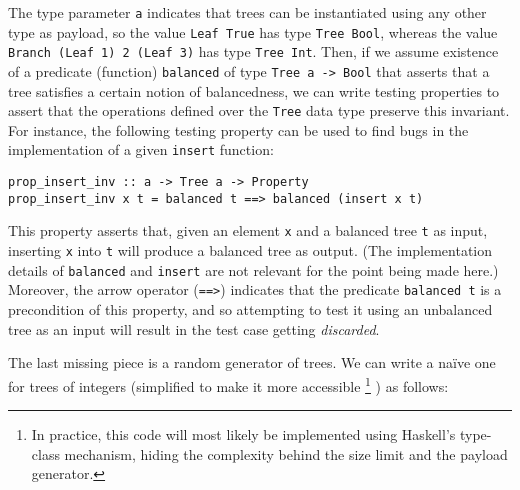 \documentclass[sigconf, anonymous, review]{acmart}
\newcommand{\quickcheck}{\textit{QuickCheck}\xspace}
\begin{document}
\noindent The type parameter \texttt{a} indicates that trees can be instantiated
using any other type as payload, so the value \texttt{Leaf True} has type
\texttt{Tree Bool}, whereas the value \texttt{Branch (Leaf 1) 2 (Leaf 3)} has
type \texttt{Tree Int}.
%
%
%
%
Then, if we assume existence of a predicate (function) \texttt{balanced} of type
\texttt{Tree a -> Bool} that asserts that a tree satisfies a certain notion of
balancedness, we can write testing properties to assert that the operations
defined over the \texttt{Tree} data type preserve this invariant.
%
For instance, the following testing property can be used to find bugs in the
implementation of a given \texttt{insert} function:

\begin{verbatim}
prop_insert_inv :: a -> Tree a -> Property
prop_insert_inv x t = balanced t ==> balanced (insert x t)
\end{verbatim}


\noindent This property asserts that, given an element \texttt{x} and a balanced
tree \texttt{t} as input, inserting \texttt{x} into \texttt{t} will produce a
balanced tree as output.
%
(The implementation details of \texttt{balanced} and \texttt{insert} are not
relevant for the point being made here.)
%
Moreover, the arrow operator (\texttt{==>}) indicates that the predicate
\texttt{balanced t} is a precondition of this property, and so attempting to
test it using an unbalanced tree as an input will result in the test case
getting \emph{discarded}.


The last missing piece is a random generator of trees.
%
We can write a na\"ive one for trees of integers (simplified to make it more accessible%
\footnote{In practice, this code will most likely be implemented using Haskell's
  type-class mechanism, hiding the complexity behind the size limit and the
  payload generator.}%
) as follows:
\end{document}
